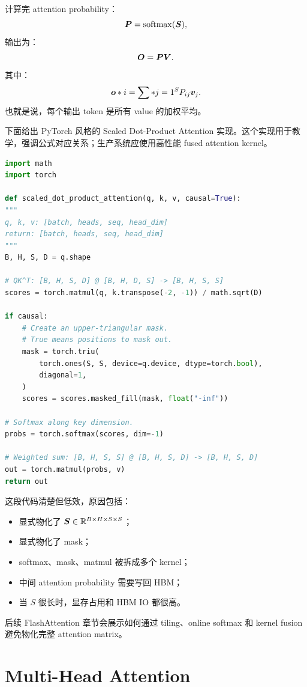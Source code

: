 计算完 attention probability：
\[
\bm{P}=\operatorname{softmax}(\bm{S}),
\]
输出为：
\[
\bm{O}=\bm{P}\bm{V}.
\]
其中：
\[
\bm{o}*i=\sum*{j=1}^{S}P_{ij}\bm{v}_j.
\]
也就是说，每个输出 token 是所有 value 的加权平均。

下面给出 PyTorch 风格的 Scaled Dot-Product Attention 实现。这个实现用于教学，强调公式对应关系；生产系统应使用高性能 fused attention kernel。

\begin{lstlisting}[language=Python,caption={教学版 Scaled Dot-Product Attention},label={lst:scaled-dot-product-attention}]
import math
import torch

def scaled_dot_product_attention(q, k, v, causal=True):
"""
q, k, v: [batch, heads, seq, head_dim]
return: [batch, heads, seq, head_dim]
"""
B, H, S, D = q.shape

# QK^T: [B, H, S, D] @ [B, H, D, S] -> [B, H, S, S]
scores = torch.matmul(q, k.transpose(-2, -1)) / math.sqrt(D)

if causal:
    # Create an upper-triangular mask.
    # True means positions to mask out.
    mask = torch.triu(
        torch.ones(S, S, device=q.device, dtype=torch.bool),
        diagonal=1,
    )
    scores = scores.masked_fill(mask, float("-inf"))

# Softmax along key dimension.
probs = torch.softmax(scores, dim=-1)

# Weighted sum: [B, H, S, S] @ [B, H, S, D] -> [B, H, S, D]
out = torch.matmul(probs, v)
return out

\end{lstlisting}

这段代码清楚但低效，原因包括：

\begin{itemize}
\item 显式物化了 $\bm{S}\in\mathbb{R}^{B\times H\times S\times S}$；
\item 显式物化了 mask；
\item softmax、mask、matmul 被拆成多个 kernel；
\item 中间 attention probability 需要写回 HBM；
\item 当 $S$ 很长时，显存占用和 HBM IO 都很高。
\end{itemize}

后续 FlashAttention 章节会展示如何通过 tiling、online softmax 和 kernel fusion 避免物化完整 attention matrix。

\section{Multi-Head Attention}
\label{sec:multi-head-attention}


